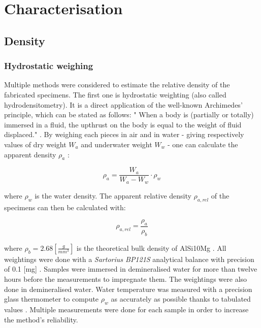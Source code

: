 
\section{Characterisation}

\subsection{Density}

\subsubsection{Hydrostatic weighing}

Multiple methods were considered to estimate the relative density of the fabricated specimens. The first one is hydrostatic weighting (also called hydrodensitometry). It is a direct application of the well-known Archimedes' principle, which can be stated as follows: " When a body is (partially or totally) immersed in a fluid, the upthrust on the body is equal to the weight of fluid displaced." \parencite{ADictionaryofPhysics}. By weighing each pieces in air and in water - giving respectively values of dry weight $W_a$ and underwater weight $W_w$ - one can calculate the apparent density $\rho_a$ \parencite{MethArch}:

$$\rho_a=\frac{W_a}{W_a-W_w} \cdot \rho_w $$

where $\rho_w$ is the water density. The apparent relative density $\rho_{a,rel}$ of the specimens can then be calculated with:

$$\rho_{a,rel} = \frac{\rho_a}{\rho_b} $$

where $\rho_b = 2.68 [\frac{g}{mm^3}]$ is the theoretical bulk density of AlSi10Mg \parencite{Bulk}. All weightings were done with a \textit{Sartorius BP121S} analytical balance with precision of 0.1 [mg] \parencite{Balance}. Samples were immersed in demineralised water for more than twelve hours before the measurements to impregnate them. The weightings were also done in demineralised water. Water temperature was measured with a precision glass thermometer to compute $\rho_w$ as accurately as possible thanks to tabulated values \parencite{Eau}. Multiple measurements were done for each sample in order to increase the method's reliability. \\

